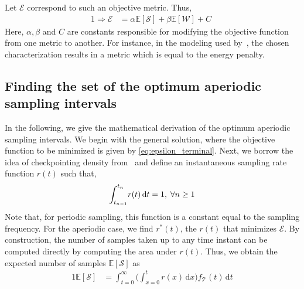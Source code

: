 Let $\mathcal{E}$ correspond to such an objective metric.
Thus, 
\begin{alignat}{1}
    \Rightarrow\mathcal{E}&=\alpha\mathbb{E}[\mathcal{S}]+\beta\mathbb{E}[\mathcal{W}]+C\;\label{eq:epsilon_terminal}
\end{alignat}
Here, $\alpha, \beta$ and $C$ are constants responsible for modifying the objective function from one metric to another.
For instance, in the modeling used by~\cite{moothedath2021energy,moothedath2022energy1,moothedath2022energy2}, the chosen characterization results in a metric which is equal to the energy penalty.

\subsection{Finding the set of the optimum aperiodic sampling intervals}

In the following, we give the mathematical derivation of the optimum aperiodic sampling intervals.
We begin with the general solution, where the objective function to be minimized is given by \cref{eq:epsilon_terminal}.
Next, we borrow the idea of checkpointing density from~\cite{satoshi1992optimal} and define an instantaneous sampling rate function $r(t)$ such that,
\begin{alignat}{1}
{\int_{t_{n-1}}^{t_n}}r(t)\,\mathrm{d} t=1,\;\forall n\geq1\label{eq:rt}
\end{alignat}
Note that, for periodic sampling, this function is a constant equal to the sampling frequency.
For the aperiodic case, we find $r^*(t)$, the $r(t)$ that minimizes $\mathcal{E}$.
By construction, the number of samples taken up to any time instant can be computed directly by computing the area under $r(t)$.
Thus, we obtain the expected number of samples $\mathbb{E}[\mathcal{S}]$ as
\begin{alignat}{1}
\mathbb{E}[\mathcal{S}]&=\int_{t=0}^{\infty}\bigg(\!\int_{x=0}^{t}\!\!\!\!r(x)\,\mathrm{d}x\bigg)f_{\mathcal{T}}(t)\,\mathrm{d}t\label{eq:Es}
\end{alignat}


